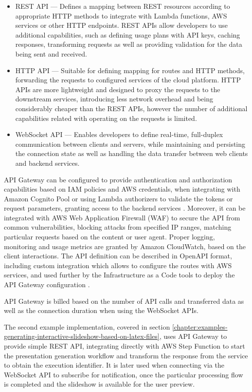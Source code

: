 \begin{itemize}
   \item REST API ---
   Defines a mapping between REST resources according to appropriate HTTP methods to integrate with Lambda functions, AWS services or other HTTP endpoints.
   REST APIs allow developers to use additional capabilities, such as defining usage plans with API keys, caching responses, transforming requests as well as providing validation for the data being sent and received.
   \item HTTP API ---
   Suitable for defining mapping for routes and HTTP methods, forwarding the requests to configured services of the cloud platform.
   HTTP APIs are more lightweight and designed to proxy the requests to the downstream services, introducing less network overhead and being considerably cheaper than the REST APIs, however the number of additional capabilities related with operating on the requests is limited.
   \item WebSocket API ---
   Enables developers to define real-time, full-duplex communication between clients and servers, while maintaining and persisting the connection state as well as handling the data transfer between web clients and backend services.
\end{itemize}

API Gateway can be configured to provide authentication and authorization capabilities based on IAM policies and AWS credentials, when integrating with Amazon Cognito Pool or using Lambda authorizers to validate the tokens or request parameters, granting access to the backend services \cite{IDidntKnowAmazonAPIGatewayDidThat}.
Moreover, it can be integrated with AWS Web Application Firewall (WAF) to secure the API from common vulnerabilities, blocking attacks from specified IP ranges, matching particular requests based on the content or user agent.
Proper logging, monitoring and usage metrics are granted by Amazon CloudWatch, based on the client interactions.
The API definition can be described in OpenAPI format, including custom integration which allows to configure the routes with AWS services, and used further by the Infrastructure as a Code tools to deploy the API Gateway configuration \cite{ApiGatewayFeatures}.

API Gateway is billed based on the number of API calls and transferred data as well as the connection duration when using the WebSocket APIs.

The second example implementation, covered in section \ref{chapter:examples-generating-interactive-slideshow-based-on-latex-files}, uses API Gateway to provide simple REST API, integrating directly with AWS Step Function to start the presentation generation workflow and transform the response from the service to obtain the execution identifier.
It is later used when connecting via the WebSocket API to subscribe for notification, once the particular processing flow is completed and the slideshow is available for the user preview.

